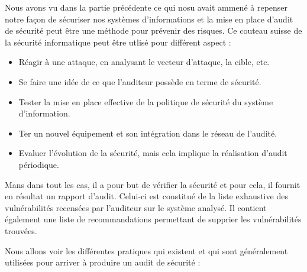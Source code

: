 \documentclass[a4paper]{memoir}
\begin{document}
Nous avons vu dans la partie précédente ce qui nosu avait ammené à repenser notre façon de sécuriser nos systèmes d'informations et la mise en place d'audit de sécurité peut être une méthode pour prévenir des risques. Ce couteau suisse de la sécurité informatique peut être utlisé pour différent aspect :

\begin{itemize}
\item Réagir à une attaque, en analysant le vecteur d'attaque, la cible, etc.
\item Se faire une idée de ce que l'auditeur possède en terme de sécurité.
\item Tester la mise en place effective de la politique de sécurité du système d'information.
\item Ter un nouvel équipement et son intégration dans le réseau de l'audité.
\item Evaluer l'évolution de la sécurité, mais cela implique la réalisation d'audit périodique.
\end{itemize}

Mans dans tout les cas, il a pour but de vérifier la sécurité et pour cela, il fournit en résultat un rapport d'audit. Celui-ci est constitué de la liste exhaustive des vulnérabilités recensées par l'auditeur sur le système analysé. Il contient également une liste de recommandations permettant de supprier les vulnérabilités trouvées.

Nous allons voir les différentes pratiques qui existent et qui sont généralement utilisées pour arriver à produire un audit de sécurité :
\end{document}

